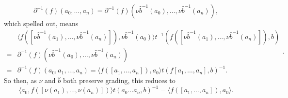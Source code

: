 \documentclass{article}
\theoremstyle{plain}
\theoremstyle{definition}
\begin{document}
$$ \partial^{-1}(f)(a_0,\ldots,a_n) = \partial^{-1}(f)(\nu\hat{b}^{-1}(a_0), \ldots, \nu\hat{b}^{-1}(a_n)),$$
which spelled out, means
$$\begin{aligned}  &\langle f([\nu\hat{b}^{-1}(a_1), \ldots, \nu\hat{b}^{-1}(a_n)]), \nu\hat{b}^{-1}(a_0) \rangle t^{-1}(f([\nu\hat{b}^{-1}(a_1), \ldots, \nu\hat{b}^{-1}(a_n)]), b) \\
=& \partial^{-1}(f)(\nu\hat{b}^{-1}(a_0), \ldots, \nu\hat{b}^{-1}(a_n)) \\
=&  \partial^{-1}(f)(a_0, a_1, \ldots, a_n) = \langle f([a_1, \ldots, a_n]), a_0 \rangle t(f[a_1,\ldots,a_n],b)^{-1}.\end{aligned}.$$
So then, as $\nu$ and $\hat{b}$ both preserve grading, this reduces to
$$\langle a_0, f([\nu(a_1), \ldots, \nu(a_n)]) \rangle t(a_0\ldots a_n, b)^{-1} = \langle  f([a_1, \ldots, a_n]), a_0 \rangle.$$
\end{document}
